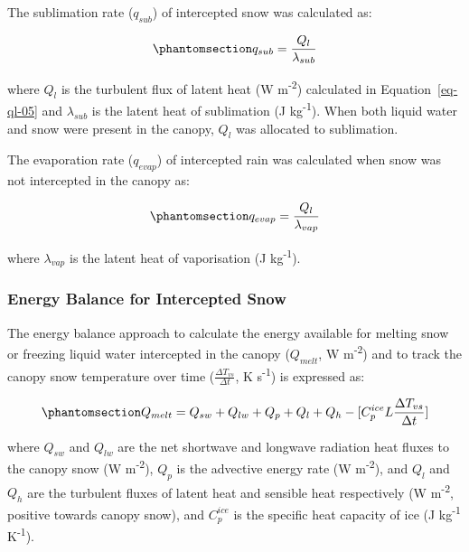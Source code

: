 \documentclass[
  letterpaper,
]{tex/uofsthesis-cs}
\begin{document}
The sublimation rate (\(q_{sub}\)) of intercepted snow was calculated
as:

\begin{equation}\phantomsection\label{eq-sub-05}{
q_{sub} = \frac{Q_l}{\lambda_{sub}}
}\end{equation}

where \(Q_l\) is the turbulent flux of latent heat (W
m\textsuperscript{-2}) calculated in Equation~\ref{eq-ql-05} and
\(\lambda_{sub}\) is the latent heat of sublimation (J
kg\textsuperscript{-1}). When both liquid water and snow were present in
the canopy, \(Q_l\) was allocated to sublimation.

The evaporation rate (\(q_{evap}\)) of intercepted rain was calculated
when snow was not intercepted in the canopy as:

\begin{equation}\phantomsection\label{eq-evap-05}{
q_{evap} = \frac{Q_l}{\lambda_{vap}}
}\end{equation}

where \(\lambda_{vap}\) is the latent heat of vaporisation (J
kg\textsuperscript{-1}).

\subsubsection{Energy Balance for Intercepted
Snow}\label{energy-balance-for-intercepted-snow}

The energy balance approach to calculate the energy available for
melting snow or freezing liquid water intercepted in the canopy
(\(Q_{melt}\), W m\textsuperscript{-2}) and to track the canopy snow
temperature over time (\(\frac{\Delta T_{vs}}{\Delta t}\), K
s\textsuperscript{-1}) is expressed as:

\begin{equation}\phantomsection\label{eq-eb-05}{
Q_{melt} = 
Q_{sw} +
Q_{lw} +
Q_{p} + Q_{l} + Q_{h} - [C_p^{ice} L \frac{\Delta T_{vs}}{\Delta t}]
}\end{equation}

where \(Q_{sw}\) and \(Q_{lw}\) are the net shortwave and longwave
radiation heat fluxes to the canopy snow (W m\textsuperscript{-2}),
\(Q_p\) is the advective energy rate (W m\textsuperscript{-2}), and
\(Q_{l}\) and \(Q_{h}\) are the turbulent fluxes of latent heat and
sensible heat respectively (W m\textsuperscript{-2}, positive towards
canopy snow), and \(C_p^{ice}\) is the specific heat capacity of ice (J
kg\textsuperscript{-1} K\textsuperscript{-1}).
\end{document}
